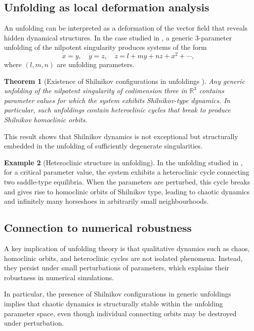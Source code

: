 \documentclass[12pt, a4paper, oneside]{book}
\theoremstyle{plain}
\newtheorem{theorem}{Theorem}[chapter]
\theoremstyle{definition}
\newtheorem{example}[theorem]{Example}
\theoremstyle{remark}
\theoremstyle{definition}
\begin{document}
\subsection{Unfolding as local deformation analysis}

An unfolding can be interpreted as a deformation of the vector field that reveals hidden dynamical structures. In the case studied in \cite{ibanez2005shil}, a generic 3-parameter unfolding of the nilpotent singularity produces systems of the form
\[
\dot{x} = y, \quad
\dot{y} = z, \quad
\dot{z} = l + my + nz + x^2 + \cdots,
\]
where $(l,m,n)$ are unfolding parameters.

\begin{theorem}[Existence of Shilnikov configurations in unfoldings \cite{ibanez2005shil}]
Any generic unfolding of the nilpotent singularity of codimension three in $\mathbb{R}^3$ contains parameter values for which the system exhibits Shilnikov-type dynamics. In particular, such unfoldings contain heteroclinic cycles that break to produce Shilnikov homoclinic orbits.
\end{theorem}

This result shows that Shilnikov dynamics is not exceptional but structurally embedded in the unfolding of sufficiently degenerate singularities.

\begin{example}[Heteroclinic structure in unfolding]
In the unfolding studied in \cite{ibanez2005shil}, for a critical parameter value, the system exhibits a heteroclinic cycle connecting two saddle-type equilibria. When the parameters are perturbed, this cycle breaks and gives rise to homoclinic orbits of Shilnikov type, leading to chaotic dynamics and infinitely many horseshoes in arbitrarily small neighbourhoods.
\end{example}

\subsection{Connection to numerical robustness}

A key implication of unfolding theory is that qualitative dynamics such as chaos, homoclinic orbits, and heteroclinic cycles are not isolated phenomena. Instead, they persist under small perturbations of parameters, which explains their robustness in numerical simulations.

In particular, the presence of Shilnikov configurations in generic unfoldings implies that chaotic dynamics is structurally stable within the unfolding parameter space, even though individual connecting orbits may be destroyed under perturbation.
\end{document}
